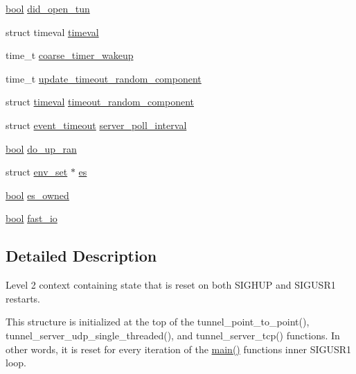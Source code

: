 \begin{DoxyCompactItemize}
\item 
\hyperlink{automatic_8c_abb452686968e48b67397da5f97445f5b}{bool} \hyperlink{structcontext__2_a367a0c4601050fe0e0368ec06c58754b}{did\+\_\+open\+\_\+tun}
\item 
struct timeval \hyperlink{structcontext__2_acbdb92043997a7c13406b3ee83e3beb2}{timeval}
\item 
time\+\_\+t \hyperlink{structcontext__2_a7a1136ef8707e675d479855614eadb10}{coarse\+\_\+timer\+\_\+wakeup}
\item 
time\+\_\+t \hyperlink{structcontext__2_a20e59bdf436934540ff063e22d71d649}{update\+\_\+timeout\+\_\+random\+\_\+component}
\item 
struct \hyperlink{structcontext__2_acbdb92043997a7c13406b3ee83e3beb2}{timeval} \hyperlink{structcontext__2_a3da875f012e28a84b4464dc6e8b91177}{timeout\+\_\+random\+\_\+component}
\item 
struct \hyperlink{structevent__timeout}{event\+\_\+timeout} \hyperlink{structcontext__2_a1aeeedd8cd4780c69f7626bcb81f4b90}{server\+\_\+poll\+\_\+interval}
\item 
\hyperlink{automatic_8c_abb452686968e48b67397da5f97445f5b}{bool} \hyperlink{structcontext__2_a267d253d04cc5ef2d91efd6ce4a8f28a}{do\+\_\+up\+\_\+ran}
\item 
struct \hyperlink{structenv__set}{env\+\_\+set} $\ast$ \hyperlink{structcontext__2_a59b42a3c7d754a42ba10acf3c035a1c2}{es}
\item 
\hyperlink{automatic_8c_abb452686968e48b67397da5f97445f5b}{bool} \hyperlink{structcontext__2_a43f0201867a96a35bbecb2e52e880e47}{es\+\_\+owned}
\item 
\hyperlink{automatic_8c_abb452686968e48b67397da5f97445f5b}{bool} \hyperlink{structcontext__2_ad8df4843172d7eaa3a83d407756f4d36}{fast\+\_\+io}
\end{DoxyCompactItemize}


\subsection{Detailed Description}
Level 2 context containing state that is reset on both {\ttfamily S\+I\+G\+H\+U\+P} and {\ttfamily S\+I\+G\+U\+S\+R1} restarts.

This structure is initialized at the top of the {\ttfamily tunnel\+\_\+point\+\_\+to\+\_\+point()}, {\ttfamily tunnel\+\_\+server\+\_\+udp\+\_\+single\+\_\+threaded()}, and {\ttfamily tunnel\+\_\+server\+\_\+tcp()} functions. In other words, it is reset for every iteration of the {\ttfamily \hyperlink{openvpn_8c_a0ddf1224851353fc92bfbff6f499fa97}{main()}} function\textquotesingle{}s inner {\ttfamily S\+I\+G\+U\+S\+R1} loop. 

